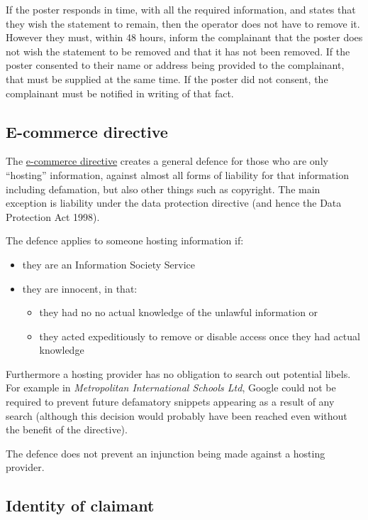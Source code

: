 \documentclass[]{article}
\begin{document}
If the poster responds in time, with all the required information, and states that they wish the statement to remain, then the operator does not have to remove it. However they must, within 48 hours, inform the complainant that the poster does not wish the statement to be removed and that it has not been removed. If the poster consented to their name or address being provided to the complainant, that must be supplied at the same time. If the poster did not consent, the complainant must be notified in writing of that fact.

\subsection{E-commerce directive}

The \href{http://eur-lex.europa.eu/legal-content/en/ALL/?uri=CELEX:32000L0031}{e-commerce directive} creates a general defence for those who are only ``hosting'' information, against almost all forms of liability for that information
including defamation, but also other things such as copyright. The main exception is liability under the data protection directive (and hence the Data Protection Act 1998). 

The defence applies to someone hosting information if:

\begin{itemize}
\item
  they are an Information Society Service
\item
  they are innocent, in that:

  \begin{itemize}
  \item
    they had no no actual knowledge of the unlawful information or
  \item
    they acted expeditiously to remove or disable access once they had actual knowledge
  \end{itemize}
\end{itemize}

Furthermore a hosting provider has no obligation to search out potential libels. For example in  \emph{Metropolitan International Schools Ltd}, Google could not  be  required to prevent future defamatory snippets appearing as a result
  of any search (although this decision would probably have been reached
  even without the benefit of the directive).

The defence does not prevent an injunction being made against a hosting provider.

\subsection{Identity of claimant}
\end{document}
